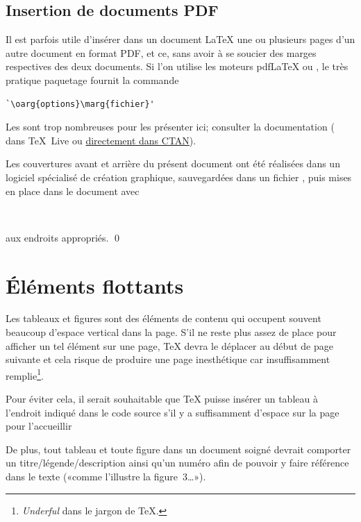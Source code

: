 \subsection{Insertion de documents PDF}
\label{sec:tableaux:figures:pdfpages}

Il est parfois utile d'insérer dans un document {\LaTeX} une ou
plusieurs pages d'un autre document en format PDF, et ce, sans avoir à
se soucier des marges respectives des deux documents. Si l'on utilise
les moteurs pdf{\LaTeX} ou {\XeLaTeX}, le très pratique paquetage
 \citep{pdfpages} fournit la commande
\begin{lstlisting}
`\oarg{options}\marg{fichier}'
\end{lstlisting}
Les  sont trop nombreuses pour les présenter ici;
consulter la documentation ( dans {\TeX}~Live ou
  \href{http://mirrors.ctan.org/macros/latex/contrib/pdfpages/pdfpages.pdf}{%
    directement dans CTAN}).

\begin{exemple}
  Les couvertures avant et arrière du présent document ont été
  réalisées dans un logiciel spécialisé de création graphique,
  sauvegardées dans un fichier , puis mises
  en place dans le document avec
\begin{lstlisting}


\end{lstlisting}
  aux endroits appropriés.
  \qed
\end{exemple}



\section{Éléments flottants}
\label{sec:tableaux:floats}

Les tableaux et figures sont des éléments de contenu qui occupent
souvent beaucoup d'espace vertical dans la page. S'il ne reste plus
assez de place pour afficher un tel élément sur une page, {\TeX} devra
le déplacer au début de page suivante et cela risque de produire une
page inesthétique car insuffisamment remplie\footnote{%
  \emph{Underful } dans le jargon de {\TeX}.}. %

Pour éviter cela, il serait souhaitable que {\TeX} puisse insérer un
tableau à l'endroit indiqué dans le code source s'il y a suffisamment
d'espace sur la page pour l'accueillir


De plus, tout tableau et toute figure dans un document soigné devrait
comporter un titre/légende/description ainsi qu'un numéro afin de
pouvoir y faire référence dans le texte («comme l'illustre la
figure~3\dots»).

